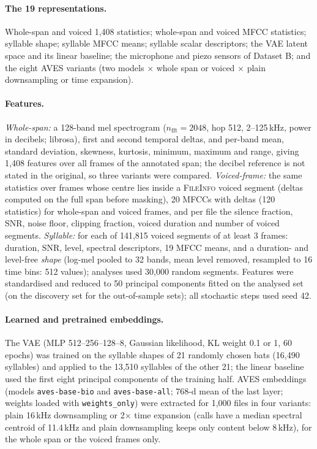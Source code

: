 \documentclass[11pt]{article}
\newcommand{\sd}{\textsc{FileInfo}}
\begin{document}
\paragraph{The 19 representations.} Whole-span and voiced 1,408 statistics; whole-span and voiced MFCC statistics; syllable shape; syllable MFCC means; syllable scalar descriptors; the VAE latent space and its linear baseline; the microphone and piezo sensors of Dataset B; and the eight AVES variants (two models $\times$ whole span or voiced $\times$ plain downsampling or time expansion).

\paragraph{Features.} \emph{Whole-span:} a 128-band mel spectrogram ($n_\mathrm{fft}=2048$, hop 512, 2--125\,kHz, power in decibels; librosa), first and second temporal deltas, and per-band mean, standard deviation, skewness, kurtosis, minimum, maximum and range, giving 1,408 features over all frames of the annotated span; the decibel reference is not stated in the original, so three variants were compared. \emph{Voiced-frame:} the same statistics over frames whose centre lies inside a \sd{} voiced segment (deltas computed on the full span before masking), 20 MFCCs with deltas (120 statistics) for whole-span and voiced frames, and per file the silence fraction, SNR, noise floor, clipping fraction, voiced duration and number of voiced segments. \emph{Syllable:} for each of 141,815 voiced segments of at least 3 frames: duration, SNR, level, spectral descriptors, 19 MFCC means, and a duration- and level-free \emph{shape} (log-mel pooled to 32 bands, mean level removed, resampled to 16 time bins: 512 values); analyses used 30,000 random segments. Features were standardised and reduced to 50 principal components fitted on the analysed set (on the discovery set for the out-of-sample sets); all stochastic steps used seed 42.

\paragraph{Learned and pretrained embeddings.} The VAE (MLP 512--256--128--8, Gaussian likelihood, KL weight 0.1 or 1, 60 epochs) was trained on the syllable shapes of 21 randomly chosen bats (16,490 syllables) and applied to the 13,510 syllables of the other 21; the linear baseline used the first eight principal components of the training half. AVES embeddings (models \texttt{aves-base-bio} and \texttt{aves-base-all}; 768-d mean of the last layer; weights loaded with \texttt{weights\_only}) were extracted for 1,000 files in four variants: plain 16\,kHz downsampling or 2$\times$ time expansion (calls have a median spectral centroid of 11.4\,kHz and plain downsampling keeps only content below 8\,kHz), for the whole span or the voiced frames only.
\end{document}
